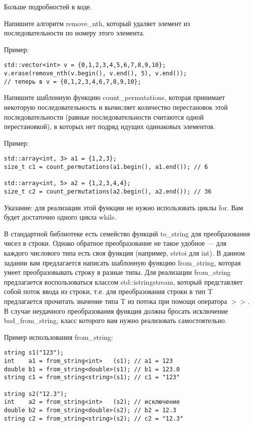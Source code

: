 \documentclass[]{article}
\begin{document}
\begin{enumerate}
Больше подробностей в коде.



Напишите алгоритм remove\_nth, который удаляет элемент из последовательности по номеру этого элемента.

Пример:
\begin{verbatim}
std::vector<int> v = {0,1,2,3,4,5,6,7,8,9,10};
v.erase(remove_nth(v.begin(), v.end(), 5), v.end());
// теперь в v = {0,1,2,3,4,6,7,8,9,10};

\end{verbatim}

Напишите шаблонную функцию count\_permutations, которая принимает некоторую последовательность и вычисляет количество перестановок этой последовательности (равные последовательности считаются одной перестановкой), в которых нет подряд идущих одинаковых элементов.

Пример:
\begin{verbatim}
std::array<int, 3> a1 = {1,2,3};
size_t c1 = count_permutations(a1.begin(), a1.end()); // 6

std::array<int, 5> a2 = {1,2,3,4,4};
size_t c2 = count_permutations(a2.begin(), a2.end()); // 36
\end{verbatim}

Указание: для реализации этой функции не нужно использовать циклы for. Вам будет достаточно одного цикла while.



В стандартной библиотеке есть семейство функций to\_string для преобразования чисел в строки. Однако обратное преобразование не такое удобное — для каждого числового типа есть своя функция (например, strtoi для int).
В данном задании вам предлагается написать шаблонную функцию from\_string, которая умеет преобразовывать строку в разные типы. Для реализации from\_string предлагается воспользоваться классом std::istringstream, который представляет собой поток ввода из строки, т.е. для преобразования строки в тип T предлагается прочитать значение типа T из потока при помощи оператора $>>$. В случае неудачного преобразования функция должна бросать исключение bad\_from\_string, класс которого вам нужно реализовать самостоятельно.

Пример использования from\_string:
\begin{verbatim}
string s1("123");
int    a1 = from_string<int>   (s1); // a1 = 123
double b1 = from_string<double>(s1); // b1 = 123.0
string c1 = from_string<string>(s1); // c1 = "123"

string s2("12.3");
int    a2 = from_string<int>   (s2); // исключение
double b2 = from_string<double>(s2); // b2 = 12.3
string c2 = from_string<string>(s2); // c2 = "12.3"


\end{verbatim}
\end{enumerate}
\end{document}
